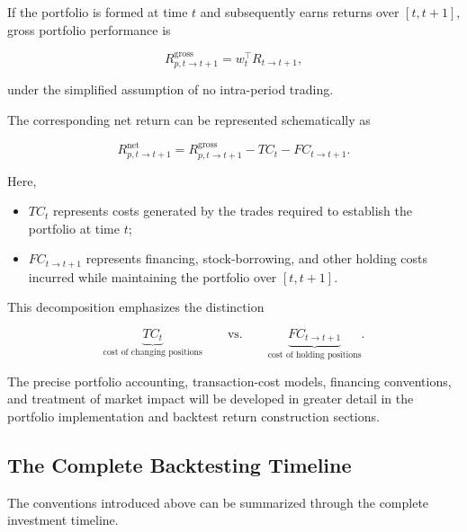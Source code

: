 \documentclass[11pt,a4paper]{article}
\begin{document}
If the portfolio is formed at time $t$ and subsequently earns returns over
$[t,t+1]$, gross portfolio performance is

\begin{equation}
R_{p,t\rightarrow t+1}^{\mathrm{gross}}
=
w_t^\top
R_{t\rightarrow t+1},
\end{equation}

under the simplified assumption of no intra-period trading.

The corresponding net return can be represented schematically as

\begin{equation}
\boxed{
R_{p,t\rightarrow t+1}^{\mathrm{net}}
=
R_{p,t\rightarrow t+1}^{\mathrm{gross}}
-
TC_t
-
FC_{t\rightarrow t+1}.
}
\end{equation}

Here,

\begin{itemize}
    \item $TC_t$ represents costs generated by the trades required to establish
    the portfolio at time $t$;

    \item $FC_{t\rightarrow t+1}$ represents financing, stock-borrowing, and
    other holding costs incurred while maintaining the portfolio over
    $[t,t+1]$.
\end{itemize}

This decomposition emphasizes the distinction

\begin{equation}
\boxed{
\underbrace{TC_t}_{\text{cost of changing positions}}
\qquad\text{vs.}\qquad
\underbrace{FC_{t\rightarrow t+1}}_{\text{cost of holding positions}}.
}
\end{equation}

The precise portfolio accounting, transaction-cost models, financing
conventions, and treatment of market impact will be developed in greater
detail in the portfolio implementation and backtest return construction
sections.

\subsection{The Complete Backtesting Timeline}
\label{subsec:complete_timeline}

The conventions introduced above can be summarized through the complete
investment timeline.
\end{document}
